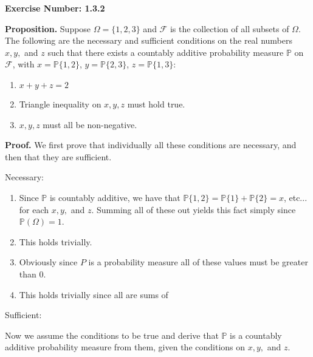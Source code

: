 \documentclass{article}
\begin{document}
\textbf{Exercise Number: 1.3.2}  %

\medskip 

\noindent \textbf{Proposition.} Suppose $\Omega = \{1,2,3\}$ and $\mathcal{F}$ is the collection of all subsets of $\Omega$. The following are the necessary and sufficient conditions on the real numbers $x,y,$ and $z$ such that there exists a countably additive probability measure $\mathbb{P}$ on $\mathcal{F}$, with $x = \mathbb{P}\{1,2\}$, $y = \mathbb{P}\{2,3\}$, $z = \mathbb{P}\{1,3\}$:

\begin{enumerate}

\item $x+ y + z = 2$

\item Triangle inequality on $x,y,z$ must hold true. 

\item $x,y,z$ must all be non-negative. 

\end{enumerate}

\bigskip

\noindent \textbf{Proof.} We first prove that individually all these conditions are necessary, and then that they are sufficient. 

\noindent Necessary:

\begin{enumerate}

\item Since $\mathbb{P}$ is countably additive, we have that $\mathbb{P}\{1,2\} = \mathbb{P}\{1\} + \mathbb{P}\{2\} = x$, etc... for each $x,y,$ and $z$. Summing all of these out yields this fact simply since $\mathbb{P}(\Omega) = 1$.

\item This holds trivially. 

\item Obviously since $P$ is a probability measure all of these values must be greater than 0. 

\item This holds trivially since all are sums of  

\end{enumerate}


\noindent Sufficient: 

Now we assume the conditions to be true and derive that $\mathbb{P}$ is a countably additive probability measure from them, given the conditions on $x,y,$ and $z$. 
\end{document}
